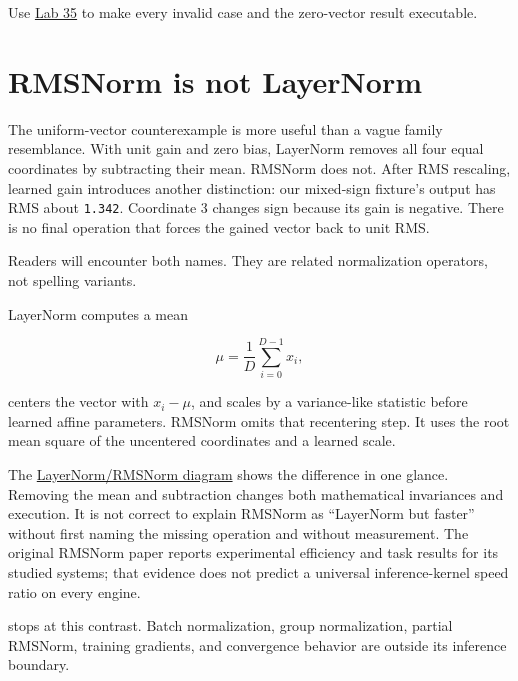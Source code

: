 Use
\href{https://github.com/hermonai/inside-the-llm-engine/blob/astra-visual-rewrite/labs/lab-35-break-epsilon.md}{Lab
35} to make every invalid case and the zero-vector result executable.

\section{RMSNorm is not LayerNorm}\label{rmsnorm-is-not-layernorm}


The uniform-vector counterexample is more useful than a vague family
resemblance. With unit gain and zero bias, LayerNorm removes all four
equal coordinates by subtracting their mean. RMSNorm does not. After RMS
rescaling, learned gain introduces another distinction: our mixed-sign
fixture's output has RMS about \texttt{1.342}. Coordinate 3 changes sign
because its gain is negative. There is no final operation that forces
the gained vector back to unit RMS.

Readers will encounter both names. They are related normalization
operators, not spelling variants.

LayerNorm computes a mean

\begin{equation}
\mu=\frac{1}{D}\sum_{i=0}^{D-1}x_i,
\end{equation}

centers the vector with \(x_i-\mu\), and scales by a variance-like
statistic before learned affine parameters. RMSNorm omits that
recentering step. It uses the root mean square of the uncentered
coordinates and a learned scale.

The
\href{https://github.com/hermonai/inside-the-llm-engine/blob/astra-visual-rewrite/diagrams/transformer/layernorm-vs-rmsnorm.txt}{LayerNorm/RMSNorm
diagram} shows the difference in one glance. Removing the mean and
subtraction changes both mathematical invariances and execution. It is
not correct to explain RMSNorm as ``LayerNorm but faster'' without first
naming the missing operation and without measurement. The original
RMSNorm paper reports experimental efficiency and task results for its
studied systems; that evidence does not predict a universal
inference-kernel speed ratio on every engine.

 stops at this contrast. Batch normalization, group
normalization, partial RMSNorm, training gradients, and convergence
behavior are outside its inference boundary.

